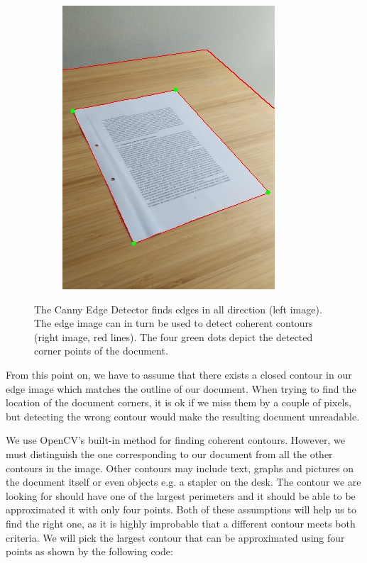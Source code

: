 \documentclass[bibliography=totoc]{scrartcl}
\begin{document}
\begin{figure}[h!]
\begin{subfigure}[b]{0.3\linewidth}
			\includegraphics[width=\linewidth]{imgs/contours/extreme_angle.jpg}
		\end{subfigure}
		\caption{The Canny Edge Detector finds edges in all direction (left image). The edge image can in turn be used to detect coherent contours (right image, red lines). The four green dots depict the detected corner points of the document.}
		\label{fig:contours}
	\end{figure}

	From this point on, we have to assume that there exists a closed contour in our edge image which matches the outline of our document. 
	When trying to find the location of the document corners, it is ok if we miss them by a couple of pixels, but detecting the wrong contour would make the resulting document unreadable.

	We use OpenCV's built-in method for finding coherent contours.
	However, we must distinguish the one corresponding to our document from all the other contours in the image.
	Other contours may include text, graphs and pictures on the document itself or even objects e.g. a stapler on the desk. 
	The contour we are looking for should have one of the largest perimeters and it should be able to be approximated it with only four points.
	Both of these assumptions will help us to find the right one, as it is highly improbable that a different contour meets both criteria. 
	We will pick the largest contour that can be approximated using four points as shown by the following code: \\
\end{document}
